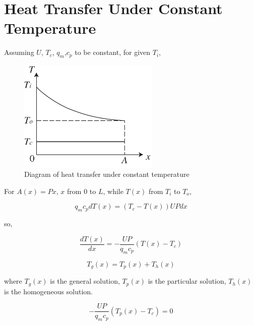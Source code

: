 \appendix

\chapter{Heat Transfer Under Constant Temperature}
Assuming $U$, $T_{c}$, $q_{m}$,$c_{p}$ to be constant, for given $T_{i}$,

\noindent \begin{center}
\begin{figure}[h]
\begin{centering}
\includegraphics[width=0.6\textwidth]{fig/ConstTempHX.pdf}
\par\end{centering}
\caption{\label{fig:CTHX}Diagram of heat transfer under constant temperature}
\end{figure}
\par\end{center}

For $A(x)=Px$, $x$ from $0$ to $L$, while $T(x)$ from $T_{i}$ to $T_{o}$,

\begin{equation}
q_{m}c_{p}dT(x)=(T_{c}-T(x))UPdx
\end{equation}

so,

\begin{equation}
\frac{dT(x)}{dx}=-\frac{UP}{q_{m}c_{p}}(T(x)-T_{c})
\end{equation}

\begin{equation}
T_{g}(x)=T_{p}(x)+T_{h}(x)
\end{equation}

where $T_{g}(x)$ is the general solution, $T_{p}(x)$ is the particular
solution, $T_{h}(x)$ is the homogeneous solution.

\begin{equation}
-\frac{UP}{q_{m}c_{p}}(T_{p}(x)-T_{c})=0
\end{equation}

